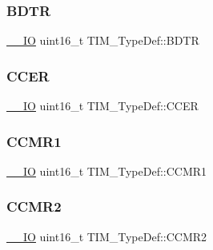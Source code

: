 \subsubsection{\texorpdfstring{BDTR}{BDTR}}
{\footnotesize\ttfamily \mbox{\hyperlink{group___c_m_s_i_s___c_m3__core__definitions_gaec43007d9998a0a0e01faede4133d6be}{\+\_\+\+\_\+\+IO}} uint16\+\_\+t T\+I\+M\+\_\+\+Type\+Def\+::\+B\+D\+TR}

\mbox{\label{struct_t_i_m___type_def_a2a7ebf9d3041dc20da591668d916f5bc}} 
\subsubsection{\texorpdfstring{CCER}{CCER}}
{\footnotesize\ttfamily \mbox{\hyperlink{group___c_m_s_i_s___c_m3__core__definitions_gaec43007d9998a0a0e01faede4133d6be}{\+\_\+\+\_\+\+IO}} uint16\+\_\+t T\+I\+M\+\_\+\+Type\+Def\+::\+C\+C\+ER}

\mbox{\label{struct_t_i_m___type_def_a9094f9bb312461d2fc1499f5f8d91c64}} 
\subsubsection{\texorpdfstring{CCMR1}{CCMR1}}
{\footnotesize\ttfamily \mbox{\hyperlink{group___c_m_s_i_s___c_m3__core__definitions_gaec43007d9998a0a0e01faede4133d6be}{\+\_\+\+\_\+\+IO}} uint16\+\_\+t T\+I\+M\+\_\+\+Type\+Def\+::\+C\+C\+M\+R1}

\mbox{\label{struct_t_i_m___type_def_a22bb9f39aae46365d3ec3c5973f90039}} 
\subsubsection{\texorpdfstring{CCMR2}{CCMR2}}
{\footnotesize\ttfamily \mbox{\hyperlink{group___c_m_s_i_s___c_m3__core__definitions_gaec43007d9998a0a0e01faede4133d6be}{\+\_\+\+\_\+\+IO}} uint16\+\_\+t T\+I\+M\+\_\+\+Type\+Def\+::\+C\+C\+M\+R2}

\mbox{\label{struct_t_i_m___type_def_a537cdfa9f0229951c2d624be6de74977}} 
